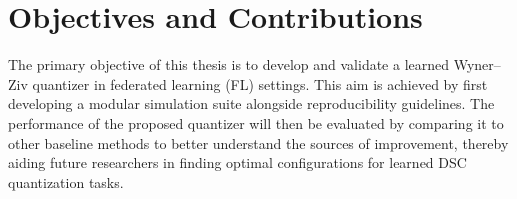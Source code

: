 \section{Objectives and Contributions}
The primary objective of this thesis is to develop and validate a learned Wyner–Ziv quantizer in federated learning (FL) settings. This aim is achieved by first developing a modular simulation suite alongside reproducibility guidelines. The performance of the proposed quantizer will then be evaluated by comparing it to other baseline methods to better understand the sources of improvement, thereby aiding future researchers in finding optimal configurations for learned DSC quantization tasks.
